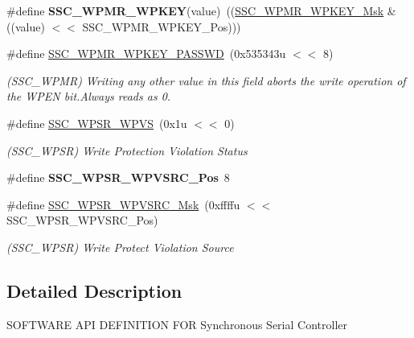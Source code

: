 \begin{DoxyCompactItemize}
\#define {\bfseries S\+S\+C\+\_\+\+W\+P\+M\+R\+\_\+\+W\+P\+K\+EY}(value)~((\mbox{\hyperlink{group__SAMV71__SSC_ga7be187a275ddfe23b8a1858da272aacc}{S\+S\+C\+\_\+\+W\+P\+M\+R\+\_\+\+W\+P\+K\+E\+Y\+\_\+\+Msk}} \& ((value) $<$$<$ S\+S\+C\+\_\+\+W\+P\+M\+R\+\_\+\+W\+P\+K\+E\+Y\+\_\+\+Pos)))
\item 
\mbox{\label{group__SAMS70__SSC_ga4bac2da515b27c22389630b3e99a9f78}} 
\#define \mbox{\hyperlink{group__SAMS70__SSC_ga4bac2da515b27c22389630b3e99a9f78}{S\+S\+C\+\_\+\+W\+P\+M\+R\+\_\+\+W\+P\+K\+E\+Y\+\_\+\+P\+A\+S\+S\+WD}}~(0x535343u $<$$<$ 8)
\begin{DoxyCompactList}\small\item\em (S\+S\+C\+\_\+\+W\+P\+MR) Writing any other value in this field aborts the write operation of the W\+P\+EN bit.\+Always reads as 0. \end{DoxyCompactList}\item 
\mbox{\label{group__SAMS70__SSC_ga842b1f6249a5c171786a2ae3881db56c}} 
\#define \mbox{\hyperlink{group__SAMS70__SSC_ga842b1f6249a5c171786a2ae3881db56c}{S\+S\+C\+\_\+\+W\+P\+S\+R\+\_\+\+W\+P\+VS}}~(0x1u $<$$<$ 0)
\begin{DoxyCompactList}\small\item\em (S\+S\+C\+\_\+\+W\+P\+SR) Write Protection Violation Status \end{DoxyCompactList}\item 
\mbox{\label{group__SAMS70__SSC_ga1c4da89fbe8aa1d737f1f41bec925bdb}} 
\#define {\bfseries S\+S\+C\+\_\+\+W\+P\+S\+R\+\_\+\+W\+P\+V\+S\+R\+C\+\_\+\+Pos}~8
\item 
\mbox{\label{group__SAMS70__SSC_ga6dbf65973e943e7e2653cc10687ae629}} 
\#define \mbox{\hyperlink{group__SAMS70__SSC_ga6dbf65973e943e7e2653cc10687ae629}{S\+S\+C\+\_\+\+W\+P\+S\+R\+\_\+\+W\+P\+V\+S\+R\+C\+\_\+\+Msk}}~(0xffffu $<$$<$ S\+S\+C\+\_\+\+W\+P\+S\+R\+\_\+\+W\+P\+V\+S\+R\+C\+\_\+\+Pos)
\begin{DoxyCompactList}\small\item\em (S\+S\+C\+\_\+\+W\+P\+SR) Write Protect Violation Source \end{DoxyCompactList}\end{DoxyCompactItemize}


\subsection{Detailed Description}
S\+O\+F\+T\+W\+A\+RE A\+PI D\+E\+F\+I\+N\+I\+T\+I\+ON F\+OR Synchronous Serial Controller 